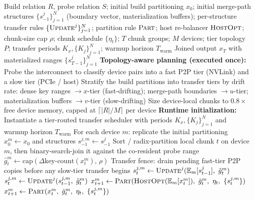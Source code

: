 \documentclass{article}
\begin{document}
\begin{algorithm}[t]
\caption{AJB: Bandwidth-Tier-Adaptive Hash Join with Decoupled Cross-Tier Transfer}
\label{alg:ajb}
\begin{algorithmic}[1]
\Require Build relation $R$, probe relation $S$;
  initial build partitioning $x_0$;
  initial merge-path structures $\{s^j_{-1}\}_{j=1}^{N}$
  (boundary vector, materialization buffers);
  per-structure transfer rules $\{\textsc{Update}^j\}_{j=1}^{N}$;
  partition rule $\textsc{Part}$; host re-balancer $\textsc{HostOpt}$;
  chunk-size cap $\rho$; chunk schedule $\{\eta_t\}$;
  $T$ chunk groups; $M$ devices; tier topology $P$;
  transfer periods $K_x, \{K_j\}_{j=1}^{N}$; warmup horizon $T_{\mathrm{warm}}$
\Ensure Joined output $x_T$ with materialized ranges $\{s^j_{T-1}\}_{j=1}^{N}$
\Statex
\State \textbf{Topology-aware planning (executed once):}
\State \quad Probe the interconnect to classify device pairs into a
       fast P2P tier (NVLink) and a slow tier (PCIe / host)
\State \quad Stratify the build partitions into transfer tiers by
       drift rate: dense key ranges $\to x$-tier (fast-drifting);
       merge-path boundaries $\to u$-tier; materialization buffers $\to
       v$-tier (slow-drifting)
\State \quad Size device-local chunks to $0.8\times$ free device memory,
       capped at $\lceil |R|/M \rceil$ per device
\Statex
\State \textbf{Runtime initialization:}
\State \quad Instantiate a tier-routed transfer scheduler with periods
       $K_x, \{K_j\}_{j=1}^{N}$ and warmup horizon $T_{\mathrm{warm}}$
\State \quad For each device $m$: replicate the initial partitioning
       $x^m_0 \gets x_0$ and structures $s^{j,m}_{-1}\gets s^j_{-1}$
\Statex
{}
    \State Sort / radix-partition local chunk $t$ on device $m$, then
           binary-search-join it against the co-resident probe range
    \State $\hat{g}^m_t \gets \mathrm{cap}(\Delta\text{key-count}(x^m_t),\,\rho)$
    \State Transfer fence: drain pending fast-tier P2P copies before any
           slow-tier transfer begins
        \State $s^{j,m}_t \gets \textsc{Update}^j(\mathbb{E}_m[s^{j}_{t-1}],\ \hat{g}^m_t)$
      \Else
        \State $s^{j,m}_t \gets \textsc{Update}^j(s^{j,m}_{t-1},\ \hat{g}^m_t)$
      \EndIf
    \EndFor
      \State $x^m_{t+1} \gets \textsc{Part}(\textsc{HostOpt}(\mathbb{E}_m[x^m_t]),\ \hat{g}^m_t,\ \eta_t,\ \{s^{j,m}_t\})$
    \Else
      \State $x^m_{t+1} \gets \textsc{Part}(x^m_t,\ \hat{g}^m_t,\ \eta_t,\ \{s^{j,m}_t\})$
    \EndIf
  \EndFor
\EndFor
\end{algorithmic}
\end{algorithm}
\end{document}
